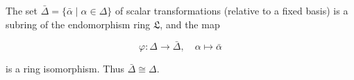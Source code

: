 The set $\bar{\Delta} = \{\bar{\alpha} \mid \alpha \in \Delta\}$ of scalar transformations (relative to a fixed basis) is a subring of the endomorphism ring $\mathfrak{L}$, and the map

$$\varphi: \Delta \to \bar{\Delta}, \quad \alpha \mapsto \bar{\alpha}$$

is a ring isomorphism. Thus $\bar{\Delta} \cong \Delta$.
